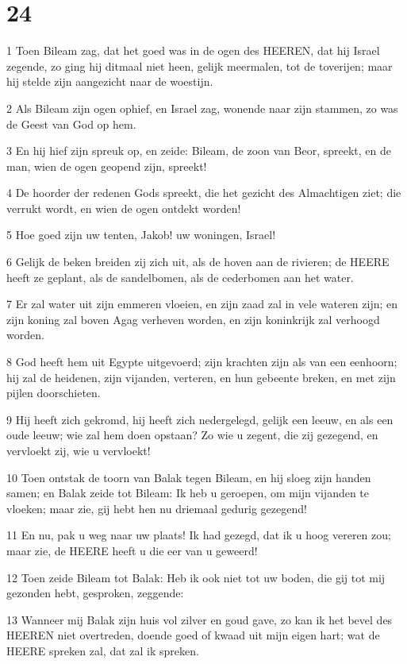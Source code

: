 \chapter{24}

\par 1 Toen Bileam zag, dat het goed was in de ogen des HEEREN, dat hij Israel zegende, zo ging hij ditmaal niet heen, gelijk meermalen, tot de toverijen; maar hij stelde zijn aangezicht naar de woestijn.
\par 2 Als Bileam zijn ogen ophief, en Israel zag, wonende naar zijn stammen, zo was de Geest van God op hem.
\par 3 En hij hief zijn spreuk op, en zeide: Bileam, de zoon van Beor, spreekt, en de man, wien de ogen geopend zijn, spreekt!
\par 4 De hoorder der redenen Gods spreekt, die het gezicht des Almachtigen ziet; die verrukt wordt, en wien de ogen ontdekt worden!
\par 5 Hoe goed zijn uw tenten, Jakob! uw woningen, Israel!
\par 6 Gelijk de beken breiden zij zich uit, als de hoven aan de rivieren; de HEERE heeft ze geplant, als de sandelbomen, als de cederbomen aan het water.
\par 7 Er zal water uit zijn emmeren vloeien, en zijn zaad zal in vele wateren zijn; en zijn koning zal boven Agag verheven worden, en zijn koninkrijk zal verhoogd worden.
\par 8 God heeft hem uit Egypte uitgevoerd; zijn krachten zijn als van een eenhoorn; hij zal de heidenen, zijn vijanden, verteren, en hun gebeente breken, en met zijn pijlen doorschieten.
\par 9 Hij heeft zich gekromd, hij heeft zich nedergelegd, gelijk een leeuw, en als een oude leeuw; wie zal hem doen opstaan? Zo wie u zegent, die zij gezegend, en vervloekt zij, wie u vervloekt!
\par 10 Toen ontstak de toorn van Balak tegen Bileam, en hij sloeg zijn handen samen; en Balak zeide tot Bileam: Ik heb u geroepen, om mijn vijanden te vloeken; maar zie, gij hebt hen nu driemaal gedurig gezegend!
\par 11 En nu, pak u weg naar uw plaats! Ik had gezegd, dat ik u hoog vereren zou; maar zie, de HEERE heeft u die eer van u geweerd!
\par 12 Toen zeide Bileam tot Balak: Heb ik ook niet tot uw boden, die gij tot mij gezonden hebt, gesproken, zeggende:
\par 13 Wanneer mij Balak zijn huis vol zilver en goud gave, zo kan ik het bevel des HEEREN niet overtreden, doende goed of kwaad uit mijn eigen hart; wat de HEERE spreken zal, dat zal ik spreken.
